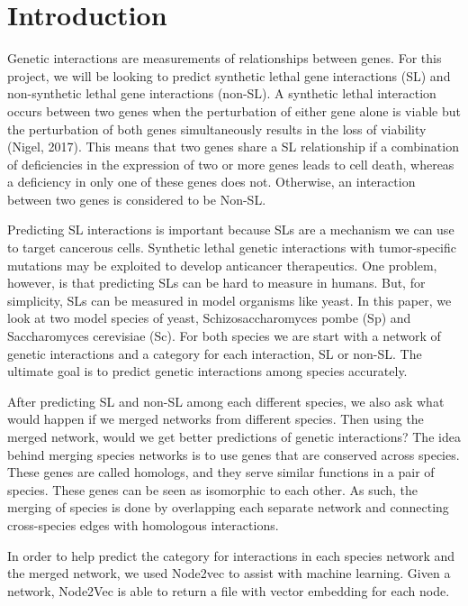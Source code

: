 \section{Introduction}
\label{sec:intro}
Genetic interactions are measurements of relationships between genes. For this project, we will be looking to predict synthetic lethal gene interactions (SL) and non-synthetic lethal gene interactions (non-SL). A synthetic lethal interaction occurs between two genes when the perturbation of either gene alone is viable but the perturbation of both genes simultaneously results in the loss of viability (Nigel, 2017). This means that two genes share a SL relationship if a combination of deficiencies in the expression of two or more genes leads to cell death, whereas a deficiency in only one of these genes does not. Otherwise, an interaction between two genes is considered to be Non-SL.

Predicting SL interactions is important because SLs are a mechanism we can use to target cancerous cells. Synthetic lethal genetic interactions with tumor-specific mutations may be exploited to develop anticancer therapeutics. One problem, however, is that predicting SLs can be hard to measure in humans. But, for simplicity, SLs can be measured in model organisms like yeast. In this paper, we look at two model species of yeast, Schizosaccharomyces pombe (Sp) and Saccharomyces cerevisiae (Sc). For both species we are start with a network of genetic interactions and a category for each interaction, SL or non-SL. The ultimate goal is to predict genetic interactions among species accurately. 

After predicting SL and non-SL among each different species, we also ask what would happen if we merged networks from different species. Then using the merged network, would we get better predictions of genetic interactions? The idea behind merging species networks is to use genes that are conserved across species. These genes are called homologs, and they serve similar functions in a pair of species. These genes can be seen as isomorphic to each other. As such, the merging of species is done by overlapping each separate network and connecting cross-species edges with homologous interactions. 

In order to help predict the category for interactions in each species network and the merged network, we used Node2vec to assist with machine learning. Given a network, Node2Vec is able to return a file with vector embedding for each node. 

